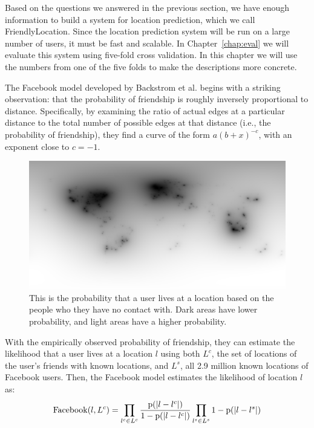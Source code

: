 
Based on the questions we answered in the previous section, we have enough
information to build a system for location prediction, which we call
FriendlyLocation.
%
Since the location prediction system will be run on a large number of users,
it must be fast and scalable.
%
In Chapter~\ref{chap:eval} we will evaluate this system using five-fold cross
validation.
%
In this chapter we will use the numbers from one of the five folds to make
the descriptions more concrete.


The Facebook model developed by Backstrom et al. \cite{backstrom2010find}
begins with a striking observation: that the probability of friendship is
roughly inversely proportional to distance.
%
Specifically, by examining the ratio of actual edges at a particular distance
to the total number of possible edges at that distance (i.e., the probability
of friendship), they find a curve of the form $a(b+x)^{-c}$, with an exponent
close to $c=-1$.

\begin{figure}[tbh]
\centering
\includegraphics[width=\linewidth]{figures/stranger_mat.png}
\caption{
    This is the probability that a user lives at a location based on the people
    who they have no contact with. Dark areas have lower probability, and light
    areas have a higher probability.
}
\label{fig:StrangerMat}
\end{figure}

With the empirically observed probability of friendship, they can estimate the
likelihood that a user lives at a location $l$ using both $L^c$, the set of
locations of the user's friends with known locations, and $L^s$, all 2.9
million known locations of Facebook users.
%
Then, the Facebook model estimates the likelihood of location $l$ as:
\[
    \operatorname{Facebook}(l,L^c) =
        \prod_{l^c \in L^c} {\operatorname{p}(|l-l^c|) \over 1-\operatorname{p}(|l-l^c|) }
        \prod_{l^s \in L^s} 1-\operatorname{p}(|l-l^s|)
\]

